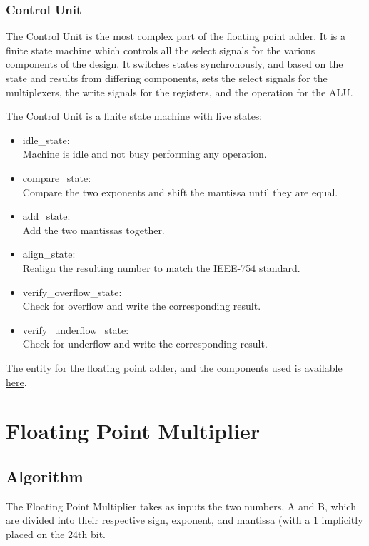 \documentclass[a4paper,10pt]{article}
\begin{document}
    \subsubsection{Control Unit}
    The Control Unit is the most complex part of the floating point adder. It is a finite state machine which controls all the select signals for the various components of the design. It switches states synchronously, and based on the state and results from differing components, sets the select signals for the multiplexers, the write signals for the registers, and the operation for the ALU.

    The Control Unit is a finite state machine with five states:
    \begin{itemize}
      \item idle\_state:\\
      Machine is idle and not busy performing any operation.
      \item compare\_state:\\
      Compare the two exponents and shift the mantissa until they are equal.
      \item add\_state:\\
      Add the two mantissas together.
      \item align\_state:\\
      Realign the resulting number to match the IEEE-754 standard.
      \item verify\_overflow\_state:\\
      Check for overflow and write the corresponding result.
      \item verify\_underflow\_state:\\
      Check for underflow and write the corresponding result.
    \end{itemize}

    The entity for the floating point adder, and the components used is available \hyperref[sec:adder]{here}.



    \newpage
    \section{Floating Point Multiplier}
    \subsection{Algorithm}
    The Floating Point Multiplier takes as inputs the two numbers, A and B, which are divided into their respective sign, exponent, and mantissa (with a 1 implicitly placed on the 24th bit.
\end{document}
